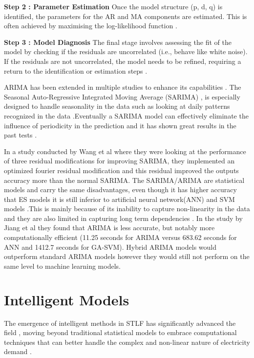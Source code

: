  \textbf{Step 2 : Parameter Estimation} Once the model structure (p, d, q) is identified, the parameters for the AR and MA components are estimated. This is often achieved by maximising the log-likelihood function \cite{ramos2015performance}.
 
 \textbf{Step 3 : Model Diagnosis} The final stage involves assessing the fit of the model by checking if the residuals are uncorrelated (i.e., behave like white noise). If the residuals are not uncorrelated, the model needs to be refined, requiring a return to the identification or estimation steps \cite{ramos2015performance}.
 
 ARIMA has been extended in multiple studies to enhance its capabilities . The Seasonal Auto-Regressive Integrated Moving Average (SARIMA) , is especially designed to handle seasonality in the data such as looking at daily patterns recognized in the data \cite{abbas2025self}.Eventually a SARIMA model can effectively eliminate the influence of periodicity in the prediction and it has shown great results in the past tests \cite{wang2012application}.
 
 In a study conducted by Wang et al  \cite{wang2012application} where they were looking at the performance of three residual modifications for improving SARIMA, they implemented an optimized fourier residual modification and this residual improved the outputs accuracy more than the normal SARIMA. The SARIMA/ARIMA are statistical models and carry the same disadvantages, even though it has higher accuracy that ES models it is still inferior to artificial neural network(ANN) and SVM models \cite{jiang2016short}.This is mainly because of its inability to capture non-linearity in the data \cite{he2019hybrid} and they are also limited in capturing long term dependencies \cite{abbas2025self}. In the study by Jiang et al \cite{jiang2016short} they found that ARIMA is less accurate, but notably more computationally efficient (11.25 seconds for ARIMA versus 683.62 seconds for ANN and 1412.7 seconds for GA-SVM). Hybrid ARIMA models would outperform standard ARIMA models however they would still not perform on the same level to machine learning models.
 

 
 

 \section{Intelligent Models}
 The emergence of intelligent methods in STLF has significantly advanced the field  , moving beyond traditional statistical models to embrace computational techniques that can better handle the complex and non-linear nature of electricity demand \cite{arvanitidis2021enhanced}.
 
